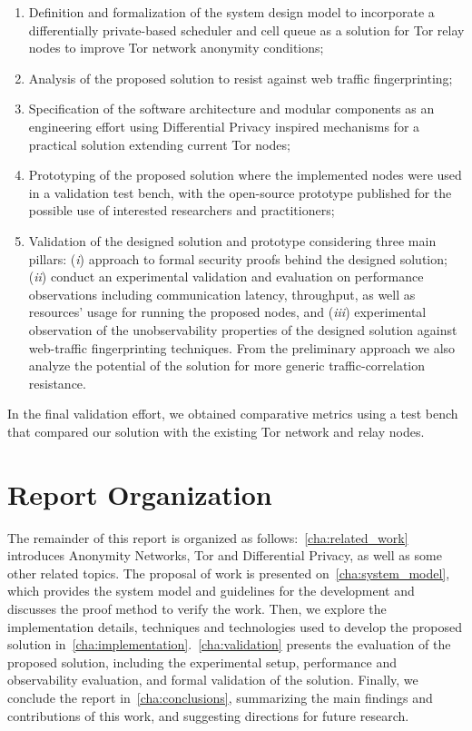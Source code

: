 \begin{enumerate}
    \item Definition and formalization of the system design model to incorporate a differentially private-based scheduler and cell queue as a solution for Tor relay nodes to improve Tor network anonymity conditions;

    \item Analysis of the proposed solution to resist against web traffic fingerprinting;

    \item Specification of the software architecture and modular components as an engineering effort using Differential Privacy inspired mechanisms for a practical solution extending current Tor nodes;
   
    \item Prototyping of the proposed solution where the implemented nodes were used in a validation test bench, with the open-source prototype published for the possible use of interested researchers and practitioners;
   
    \item Validation of the designed solution and prototype considering three main pillars: (\emph{i}) approach to formal security proofs behind the designed solution; (\emph{ii}) conduct an experimental validation and evaluation on performance observations including communication latency, throughput, as well as resources' usage for running the proposed nodes, and (\emph{iii}) experimental observation of the unobservability properties of the designed solution against web-traffic fingerprinting techniques. From the preliminary approach we also analyze the potential of the solution for more generic traffic-correlation resistance.
   
\end{enumerate}

In the final validation effort, we obtained comparative metrics using a test bench that compared our solution with the existing Tor network and relay nodes.


\section{Report Organization}\label{sec:report_organization}
The remainder of this report is organized as follows:~\cref{cha:related_work} introduces Anonymity Networks, Tor and Differential Privacy, as well as some other related topics. The proposal of work is presented on~\cref{cha:system_model}, which provides the system model and guidelines for the development and discusses the proof method to verify the work. Then, we explore the implementation details, techniques and technologies used to develop the proposed solution in~\cref{cha:implementation}.~\cref{cha:validation} presents the evaluation of the proposed solution, including the experimental setup, performance and observability evaluation, and formal validation of the solution. Finally, we conclude the report in~\cref{cha:conclusions}, summarizing the main findings and contributions of this work, and suggesting directions for future research.